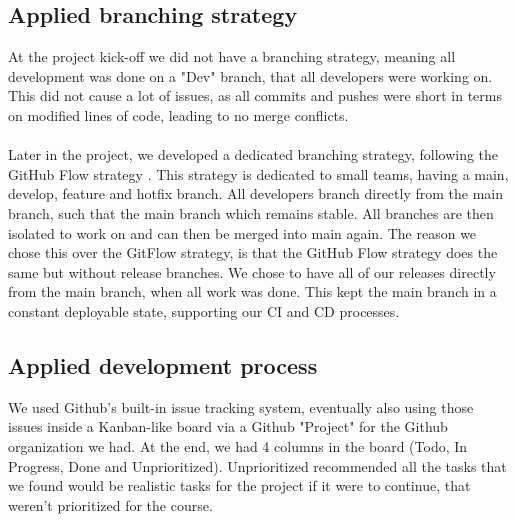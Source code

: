 \subsection{Applied branching strategy}\label{subsec:branching_strategy}
At the project kick-off we did not have a branching strategy, meaning all development was done on a "Dev" branch, that all developers were working on. This did not cause a lot of issues, as all commits and pushes were short in terms on modified lines of code, leading to no merge conflicts.
\\\\
Later in the project, we developed a dedicated branching strategy, following the GitHub Flow strategy \cite{branching_strategy}. This strategy is dedicated to small teams, having a main, develop, feature and hotfix branch. All developers branch directly from the main branch, such that the main branch which remains stable. All branches are then isolated to work on and can then be merged into main again. The reason we chose this over the GitFlow strategy, is that the GitHub Flow strategy does the same but without release branches. We chose to have all of our releases directly from the main branch, when all work was done. This kept the main branch in a constant deployable state, supporting our CI and CD processes.

\subsection{Applied development process}
We used Github's built-in issue tracking system, eventually also using those issues inside a Kanban-like board via a Github "Project" for the Github organization we had. At the end, we had 4 columns in the board (Todo, In Progress, Done and Unprioritized). Unprioritized recommended all the tasks that we found would be realistic tasks for the project if it were to continue, that weren't prioritized for the course. 
